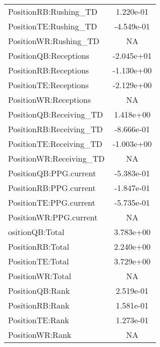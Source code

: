 {\begin{tabular}{lc}
PositionRB:Rushing\_TD    	&  1.220e-01 \\
PositionTE:Rushing\_TD    	& -4.549e-01 \\
PositionWR:Rushing\_TD    	&         NA \\
PositionQB:Receptions    	& -2.045e+01 \\
PositionRB:Receptions    	& -1.130e+00 \\
PositionTE:Receptions    	& -2.129e+00 \\
PositionWR:Receptions    	&         NA \\
PositionQB:Receiving\_TD 	&  1.418e+00 \\
PositionRB:Receiving\_TD 	& -8.666e-01 \\
PositionTE:Receiving\_TD 	& -1.003e+00 \\
PositionWR:Receiving\_TD 	&         NA \\
PositionQB:PPG.current  	& -5.383e-01 \\
PositionRB:PPG.current  	& -1.847e-01 \\
PositionTE:PPG.current  	& -5.735e-01 \\
PositionWR:PPG.current  	&         NA \\
ositionQB:Total         	& 3.783e+00  \\
PositionRB:Total        	&  2.240e+00 \\
PositionTE:Total        	&  3.729e+00 \\
PositionWR:Total        	&         NA \\
PositionQB:Rank         	&  2.519e-01 \\
PositionRB:Rank         	&  1.581e-01 \\
PositionTE:Rank         	&  1.273e-01 \\
PositionWR:Rank         	&         NA \\
	\bottomrule
\end{tabular}
}
